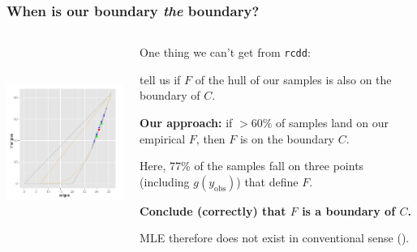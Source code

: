 \documentclass[ 10pt]{beamer}
\newcommand{\yobs}{y_{\text{obs}}}
\begin{document}
\frame
{
\frametitle{When is our boundary \emph{the} boundary?}  

\begin{columns}[T]
\begin{column}[T]{0.25\textwidth}
\includegraphics[height=2.5in,trim=3.5in 2in 0.15in 0.05in,clip=true]{MCsample-77face} %
\end{column}

\begin{column}[T]{0.75\textwidth}
One thing we can't get from \texttt{rcdd}: 

tell us if $F$ of the hull 
of our samples is also on the boundary of $C$.  
\vspace{2mm}

\textbf{Our approach:} if $>60\%$ of samples land on our empirical $F$, then $F$ is on the boundary $C$.
\vspace{4mm}

\pause
Here, 77\% of the samples fall on three points (including $g(\yobs)$) that define $F$.  
\vspace{2mm}

\textbf{Conclude (correctly) that $F$ is a boundary of $C$.}

MLE therefore does not exist in conventional sense (\alert{\checkmark}).

\end{column}
\end{columns}
}
%
%
%
%
%
%
\end{document}
